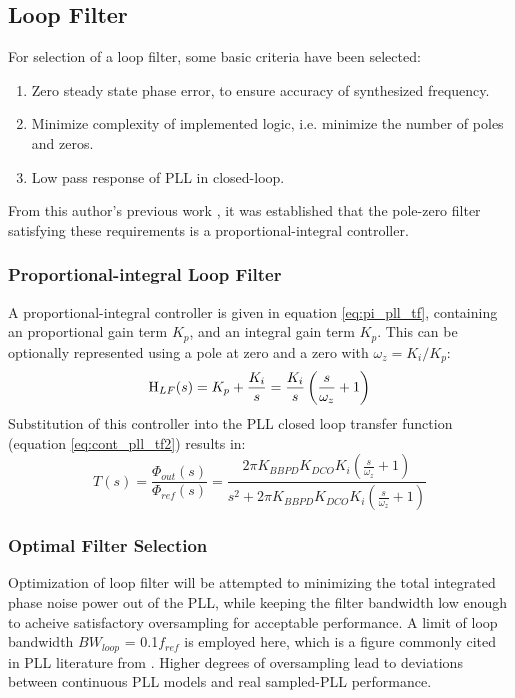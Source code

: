 	\FloatBarrier
	\subsection{Loop Filter}
	For selection of a loop filter, some basic criteria have been selected:
	\begin{enumerate}[itemsep=0pt,label=\protect\mycirc{\arabic*}]
		\setlength\itemsep{-0.8em}
		\item Zero steady state phase error, to ensure accuracy of synthesized frequency.
		\item Minimize complexity of implemented logic, i.e. minimize the number of poles and zeros.
		\item Low pass response of PLL in closed-loop.
	\end{enumerate}
	From this author's previous work \cite{Me}, it was established that the pole-zero filter satisfying these requirements is a proportional-integral controller.

\subsubsection{Proportional-integral Loop Filter}
 A proportional-integral controller \cite{ogata_2010_pid} is given in equation \ref{eq:pi_pll_tf}, containing an proportional gain term $K_p$, and an integral gain term $K_p$. This can be optionally represented using a pole at zero and a zero with $\omega_z = K_i/K_p$:
			\begin{equation} \label{eq:pi_pll_tf}
				\textnormal{H}_{LF}(s) = K_p + \frac{K_i}{s}  = \frac{K_i}{s}\left(\frac{s}{\omega_z} + 1\right) 
			\end{equation}
			Substitution of this controller into the PLL closed loop transfer function (equation \ref{eq:cont_pll_tf2}) results in:
			\begin{equation}\label{eq:pi_bbpdpll_tf}
				T(s) = \frac{\Phi_{out}(s)}{\Phi_{ref}(s)} =  \frac{ 2\pi K_{BBPD}K_{DCO}K_{i} \left(\frac{s}{\omega_z} + 1\right) }{s^2 + 2\pi K_{BBPD}K_{DCO}K_{i}\left(\frac{s}{\omega_z} + 1\right) }
			\end{equation}
\subsubsection{Optimal Filter Selection}
			Optimization of loop filter will be attempted to minimizing the total integrated phase noise power out of the PLL, while keeping the filter bandwidth low enough to acheive satisfactory oversampling for acceptable performance. A limit of loop bandwidth $BW_{loop}$ = 0.1$f_{ref}$ is employed here, which is a figure commonly cited in PLL literature from \cite{gardner_1980}. Higher degrees of oversampling lead to deviations between continuous PLL models and real sampled-PLL performance. 

